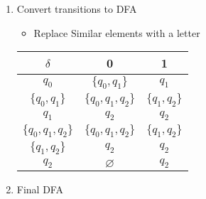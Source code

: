 \documentclass{article}
\def\hltt{\color{BrightGreen}}
\newcommand{\indentpar}[2]{
	\begin{itemize}[leftmargin=#1,label=]
		\item #2
	\end{itemize}
}
\newlength{\ansindent}
\begin{document}
\begin{enumerate}[label=\arabic*)]
\begin{enumerate}[label=Step \arabic* :,itemindent=\ansindent]
\begin{table}[H]
\begin{tabular}{cc}
\begin{tabular}{c|c|c}
								$\{q_0,q_1,q_2\}$ & $\{q_0,q_1,q_2\}$ & $\{q_1,q_2\}$
							\end{tabular} &
							\begin{tabular}{ccc}
								$\delta(q_0,0)$             & $=$ & $\{q_0,q_1\}$     \\
								$\delta(q_0,1)$             & $=$ & $q_1$             \\
								$\delta(q_1,0)$             & $=$ & $q_2$             \\
								$\delta(q_1,1)$             & $=$ & $q_2$             \\
								$\delta(q_2,1)$             & $=$ & $q_2$             \\
								$\delta(\{q_0,q_1\},0)$     & $=$ & $\{q_0,q_1,q_2\}$ \\
								$\delta(\{q_0,q_1\},1)$     & $=$ & $\{q_1,q_2\}$     \\
								$\delta(\{q_1,q_2\},0)$     & $=$ & $q_2$             \\
								$\delta(\{q_1,q_2\},1)$     & $=$ & $q_2$             \\
								$\delta(\{q_0,q_2\},0)$     & $=$ & $\{q_0,q_1\}$     \\
								$\delta(\{q_0,q_2\},1)$     & $=$ & $\{q_1,q_2\}$     \\
								$\delta(\{q_0,q_1,q_2\},0)$ & $=$ & $\{q_1,q_2\}$     \\
								$\delta(\{q_0,q_1,q_2\},1)$ & $=$ & $\{q_1,q_2\}$
							\end{tabular}
						\end{tabular}
					\end{table}
				\item Convert transitions to DFA
					\indentpar{1.5em}{Replace Similar elements with a letter}
					\begin{table}[H]
						\centering
						\begin{tabular}{c|c|c}
							$\delta$          & 0                       & 1                   \\ \hline
					\hltt	$q_0$             & $\{q_0,q_1\}$           & $q_1$               \\
					\hltt	$\{q_0,q_1\}$     & $\{q_0,q_1,q_2\}$       & $\{q_1,q_2\}$       \\
					\hltt	$q_1$             & $q_2$                   & $q_2$               \\
					\hltt	$\{q_0,q_1,q_2\}$ & \hltt $\{q_0,q_1,q_2\}$ & \hltt $\{q_1,q_2\}$ \\
					\hltt	$\{q_1,q_2\}$     & \hltt $q_2$             & \hltt	$q_2$         \\
					\hltt	$q_2$             & $\varnothing$           & \hltt	$q_2$
						\end{tabular}
					\end{table} \newpage
				\item Final DFA 
			\end{enumerate}
	\end{enumerate} \newpage
\end{document}
